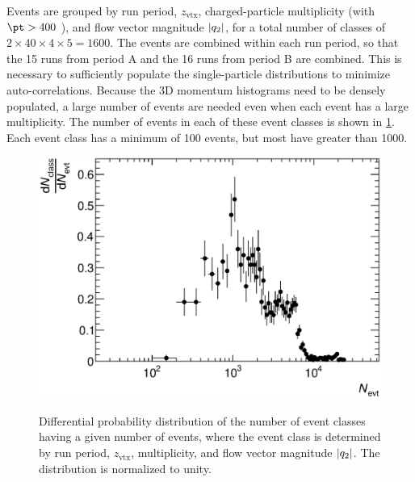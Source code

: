 Events are grouped by run period, $z_\textrm{vtx}$, charged-particle multiplicity \Nch (with $\pt > 400$ \MeV), and flow vector magnitude $|q_{2}|$, for a total number of classes of $2 \times 40 \times 4 \times 5 = 1600$.
The events are combined within each run period, so that the 15 runs from period A and the 16 runs from period B are combined.
This is necessary to sufficiently populate the single-particle distributions to minimize auto-correlations.
Because the 3D momentum histograms need to be densely populated, a large number of events are needed even when each event has a large multiplicity.
The number of events in each of these event classes is shown in \cref{fig:evt_class}.
Each event class has a minimum of 100 events, but most have greater than 1000.

\begin{figure}[t]
\centering
\includegraphics{evt_class.eps}\\
\caption{Differential probability distribution of the number of event classes having a given number of events, where the event class is determined by run period, $z_\textrm{vtx}$, multiplicity, and flow vector magnitude $|q_{2}|$. The distribution is normalized to unity.}
\label{fig:evt_class}
\end{figure}

